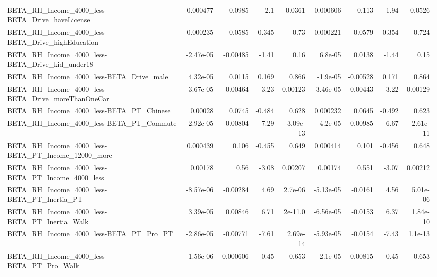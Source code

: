 \begin{tabular}{lrrrrrrrr}
BETA\_RH\_Income\_4000\_less-BETA\_Drive\_haveLicense    &   -0.000477 &      -0.0985 &     -2.1 &   0.0361 &  -0.000606 &      -0.113 &        -1.94 &        0.0526 \\
BETA\_RH\_Income\_4000\_less-BETA\_Drive\_highEducation  &    0.000235 &       0.0585 &   -0.345 &     0.73 &   0.000221 &      0.0579 &       -0.354 &         0.724 \\
BETA\_RH\_Income\_4000\_less-BETA\_Drive\_kid\_under18    &   -2.47e-05 &     -0.00485 &    -1.41 &     0.16 &    6.8e-05 &      0.0138 &        -1.44 &          0.15 \\
BETA\_RH\_Income\_4000\_less-BETA\_Drive\_male           &    4.32e-05 &       0.0115 &    0.169 &    0.866 &   -1.9e-05 &    -0.00528 &        0.171 &         0.864 \\
BETA\_RH\_Income\_4000\_less-BETA\_Drive\_moreThanOneCar &    3.67e-05 &      0.00464 &    -3.23 &  0.00123 &  -3.46e-05 &    -0.00443 &        -3.22 &       0.00129 \\
BETA\_RH\_Income\_4000\_less-BETA\_PT\_Chinese           &     0.00028 &       0.0745 &   -0.484 &    0.628 &   0.000232 &      0.0645 &       -0.492 &         0.623 \\
BETA\_RH\_Income\_4000\_less-BETA\_PT\_Commute           &   -2.92e-05 &     -0.00804 &    -7.29 & 3.09e-13 &   -4.2e-05 &    -0.00985 &        -6.67 &      2.61e-11 \\
BETA\_RH\_Income\_4000\_less-BETA\_PT\_Income\_12000\_more &    0.000439 &        0.106 &   -0.455 &    0.649 &   0.000414 &       0.101 &       -0.456 &         0.648 \\
BETA\_RH\_Income\_4000\_less-BETA\_PT\_Income\_4000\_less  &     0.00178 &         0.56 &    -3.08 &  0.00207 &    0.00174 &       0.551 &        -3.07 &       0.00212 \\
BETA\_RH\_Income\_4000\_less-BETA\_PT\_Inertia\_PT        &   -8.57e-06 &     -0.00284 &     4.69 &  2.7e-06 &  -5.13e-05 &     -0.0161 &         4.56 &      5.01e-06 \\
BETA\_RH\_Income\_4000\_less-BETA\_PT\_Inertia\_Walk      &    3.39e-05 &      0.00846 &     6.71 &  2e-11.0 &  -6.56e-05 &     -0.0153 &         6.37 &      1.84e-10 \\
BETA\_RH\_Income\_4000\_less-BETA\_PT\_Pro\_PT            &   -2.86e-05 &     -0.00771 &    -7.61 & 2.69e-14 &  -5.93e-05 &     -0.0154 &        -7.43 &       1.1e-13 \\
BETA\_RH\_Income\_4000\_less-BETA\_PT\_Pro\_Walk          &   -1.56e-06 &    -0.000606 &    -0.45 &    0.653 &   -2.1e-05 &    -0.00815 &        -0.45 &         0.653 \\

\end{tabular}
